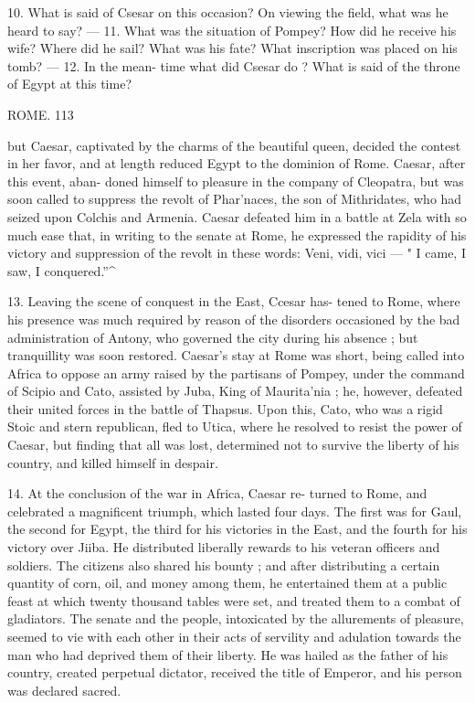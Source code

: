 \documentclass[openany,a4paper]{memoir}
\begin{document}
10. What is said of Csesar on this occasion? On viewing the field, 
what was he heard to say? — 11. What was the situation of Pompey? 
How did he receive his wife? Where did he sail? What was his 
fate? What inscription was placed on his tomb? — 12. In the mean- 
time what did Csesar do ? What is said of the throne of Egypt at this 
time? 



ROME. 113 

but Caesar, captivated by the charms of the beautiful queen, 
decided the contest in her favor, and at length reduced Egypt 
to the dominion of Rome. Caesar, after this event, aban- 
doned himself to pleasure in the company of Cleopatra, but 
was soon called to suppress the revolt of Phar'naces, the son 
of Mithridates, who had seized upon Colchis and Armenia. 
Caesar defeated him in a battle at Zela with so much ease 
that, in writing to the senate at Rome, he expressed the 
rapidity of his victory and suppression of the revolt in these 
words: Veni, vidi, vici — " I came, I saw, I conquered.''^ 

13. Leaving the scene of conquest in the East, Ccesar has- 
tened to Rome, where his presence was much required by 
reason of the disorders occasioned by the bad administration 
of Antony, who governed the city during his absence ; but 
tranquillity was soon restored. Caesar's stay at Rome was 
short, being called into Africa to oppose an army raised by 
the partisans of Pompey, under the command of Scipio and 
Cato, assisted by Juba, King of Maurita'nia ; he, however, 
defeated their united forces in the battle of Thapsus. Upon 
this, Cato, who was a rigid Stoic and stern republican, fled 
to Utica, where he resolved to resist the power of Caesar, 
but finding that all was lost, determined not to survive the 
liberty of his country, and killed himself in despair. 

14. At the conclusion of the war in Africa, Caesar re- 
turned to Rome, and celebrated a magnificent triumph, which 
lasted four days. The first was for Gaul, the second for 
Egypt, the third for his victories in the East, and the fourth 
for his victory over Jiiba. He distributed liberally rewards 
to his veteran officers and soldiers. The citizens also shared 
his bounty ; and after distributing a certain quantity of corn, 
oil, and money among them, he entertained them at a public 
feast at which twenty thousand tables were set, and treated 
them to a combat of gladiators. The senate and the people, 
intoxicated by the allurements of pleasure, seemed to vie with 
each other in their acts of servility and adulation towards the 
man who had deprived them of their liberty. He was hailed as 
the father of his country, created perpetual dictator, received 
the title of Emperor, and his person was declared sacred. 
\end{document}
